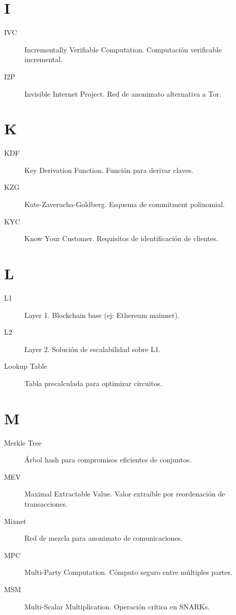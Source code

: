\documentclass[11pt,a4paper,twoside]{book}
\theoremstyle{definition}
\theoremstyle{remark}
\begin{document}
\section*{I}
\begin{description}
\item[IVC] Incrementally Verifiable Computation. Computación verificable incremental.
\item[I2P] Invisible Internet Project. Red de anonimato alternativa a Tor.
\end{description}

\section*{K}
\begin{description}
\item[KDF] Key Derivation Function. Función para derivar claves.
\item[KZG] Kate-Zaverucha-Goldberg. Esquema de commitment polinomial.
\item[KYC] Know Your Customer. Requisitos de identificación de clientes.
\end{description}

\section*{L}
\begin{description}
\item[L1] Layer 1. Blockchain base (ej: Ethereum mainnet).
\item[L2] Layer 2. Solución de escalabilidad sobre L1.
\item[Lookup Table] Tabla precalculada para optimizar circuitos.
\end{description}

\section*{M}
\begin{description}
\item[Merkle Tree] Árbol hash para compromisos eficientes de conjuntos.
\item[MEV] Maximal Extractable Value. Valor extraíble por reordenación de transacciones.
\item[Mixnet] Red de mezcla para anonimato de comunicaciones.
\item[MPC] Multi-Party Computation. Cómputo seguro entre múltiples partes.
\item[MSM] Multi-Scalar Multiplication. Operación crítica en SNARKs.
\end{description}
\end{document}
